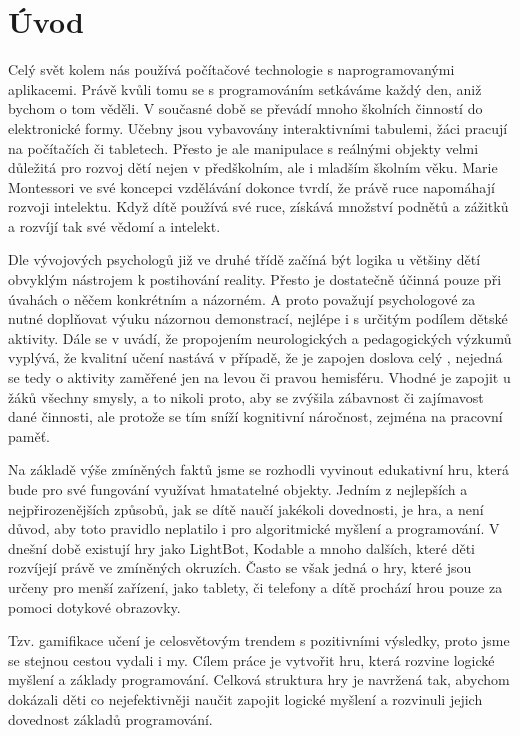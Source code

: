 \chapter{Úvod}

Celý svět kolem nás používá počítačové technologie s naprogramovanými aplikacemi. Právě kvůli tomu se s programováním setkáváme každý den, aniž bychom o tom věděli. V současné době se převádí mnoho školních činností do elektronické formy. Učebny jsou vybavovány interaktivními tabulemi, žáci pracují na počítačích či tabletech. Přesto je ale manipulace s reálnými objekty velmi důležitá pro rozvoj dětí nejen v předškolním, ale i mladším školním věku. Marie Montessori ve své koncepci vzdělávání dokonce tvrdí, že právě ruce napomáhají rozvoji intelektu. Když dítě používá své ruce, získává množství podnětů a zážitků a rozvíjí tak své vědomí a intelekt. \cite{Montessori}
\par
Dle vývojových psychologů \cite{VyvojovaPsychologie} již ve druhé třídě začíná být logika u většiny dětí obvyklým nástrojem k postihování reality. Přesto je dostatečně účinná pouze při úvahách o něčem konkrétním a názorném. A proto považují psychologové za nutné doplňovat výuku názornou demonstrací, nejlépe i s určitým podílem dětské aktivity. Dále se v \cite{ASE} uvádí, že propojením neurologických a pedagogických výzkumů vyplývá, že kvalitní učení nastává v případě, že je zapojen doslova celý  , nejedná se tedy o aktivity zaměřené jen na levou či pravou hemisféru. Vhodné je zapojit u žáků všechny smysly, a to nikoli proto, aby se zvýšila zábavnost či zajímavost dané činnosti, ale protože se tím sníží kognitivní náročnost, zejména na pracovní paměť.
\par
Na základě výše zmíněných faktů jsme se rozhodli vyvinout edukativní hru, která bude pro své fungování využívat hmatatelné objekty. Jedním z nejlepších a nejpřirozenějších způsobů, jak se dítě naučí jakékoli dovednosti, je hra, a není důvod, aby toto pravidlo neplatilo i pro algoritmické myšlení a programování. V dnešní době existují hry jako LightBot, Kodable a mnoho dalších, které děti rozvíjejí právě ve zmíněných okruzích. Často se však jedná o hry, které jsou určeny pro menší zařízení, jako tablety, či telefony a dítě prochází hrou pouze za pomoci dotykové obrazovky.
\par
Tzv. gamifikace učení je celosvětovým trendem s pozitivními výsledky, proto jsme se stejnou cestou vydali i my. Cílem práce je vytvořit hru, která rozvine logické myšlení a základy programování. Celková struktura hry je navržená tak, abychom dokázali děti co nejefektivněji naučit zapojit logické myšlení a rozvinuli jejich dovednost základů programování.